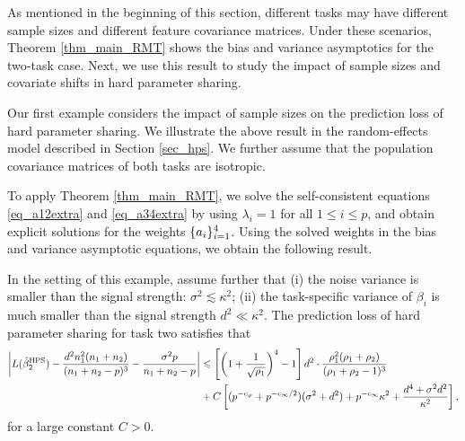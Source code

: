 As mentioned in the beginning of this section, different tasks may have different sample sizes and different feature covariance matrices.
Under these scenarios, Theorem \ref{thm_main_RMT} shows the bias and variance asymptotics for the two-task case.
Next, we use this result to study the impact of sample sizes and covariate shifts in hard parameter sharing.

\begin{example}
	Our first example considers the impact of sample sizes on the prediction loss of hard parameter sharing.
	We illustrate the above result in the random-effects model described in Section \ref{sec_hps}.
	We further assume that the population covariance matrices of both tasks are isotropic.

	To apply Theorem \ref{thm_main_RMT}, we solve the self-consistent equations \eqref{eq_a12extra} and \eqref{eq_a34extra} by using $\lambda_i = 1$ for all $1\le i\le p$, and obtain explicit solutions for the weights $\{a_i\}_{i=1}^4$.
Using the solved weights in the bias and variance asymptotic equations, we obtain the following result.

\begin{corollary}\label{cor_MTL_loss}
	In the setting of this example, assume further that
	(i) the noise variance is smaller than the signal strength: $\sigma^2 \lesssim  \kappa^2$;
	(ii) the task-specific variance of $\beta_i$ is much smaller than the signal strength $d^2 \ll {\kappa^2}$. 
	The prediction loss of hard parameter sharing for task two satisfies that
	\begin{align}\label{cor_MTL_error}
	  \left|L(\hat{\beta}_2^{\textup{HPS}}) - \frac{d^2 n_1^2 (n_1 + n_2)}{(n_1 + n_2 - p)^3} -\frac{\sigma^2 p}{n_1 + n_2 - p}  \right|  & \leqslant  \left[\left( 1+\frac{1}{\sqrt{\rho_1}}\right)^4-1\right] d^2\cdot \frac{\rho_1^2 (\rho_1+\rho_2)}{(\rho_1 + \rho_2 - 1)^3} \\
	& +C \left[(p^{-c_\varphi}+p^{-c_\infty/2})(\sigma^2 +d^2)+p^{-c_\infty}\kappa^2 + \frac{d^4+\sigma^2 d^2}{\kappa^2}\right],\nonumber
	 \end{align}
	 for a large constant $C>0$.
\end{corollary}



\end{example}
